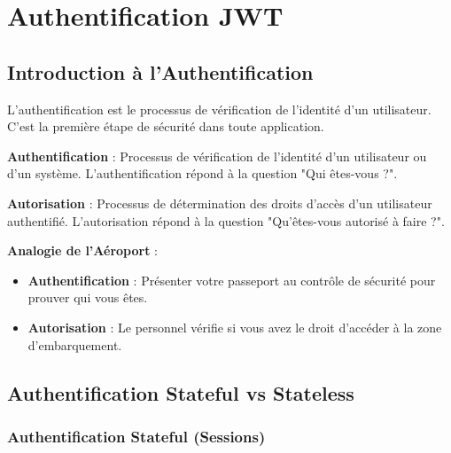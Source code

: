 \chapter{Authentification JWT}

\section{Introduction à l'Authentification}

L'authentification est le processus de vérification de l'identité d'un utilisateur. C'est la première étape de sécurité dans toute application.

\begin{definitionbox}
    \textbf{Authentification} : Processus de vérification de l'identité d'un utilisateur ou d'un système. L'authentification répond à la question "Qui êtes-vous ?".
\end{definitionbox}

\begin{definitionbox}
    \textbf{Autorisation} : Processus de détermination des droits d'accès d'un utilisateur authentifié. L'autorisation répond à la question "Qu'êtes-vous autorisé à faire ?".
\end{definitionbox}

\begin{analogybox}
    \textbf{Analogie de l'Aéroport} :
    \begin{itemize}
        \item \textbf{Authentification} : Présenter votre passeport au contrôle de sécurité pour prouver qui vous êtes.
        \item \textbf{Autorisation} : Le personnel vérifie si vous avez le droit d'accéder à la zone d'embarquement.
    \end{itemize}
\end{analogybox}

\section{Authentification Stateful vs Stateless}

\subsection{Authentification Stateful (Sessions)}

